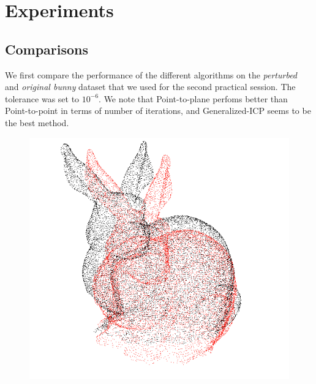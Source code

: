 \documentclass[11pt,letterpaper,leqno]{article}
\begin{document}
\section{Experiments}

\subsection{Comparisons}
We first compare the performance of the different algorithms on the \textit{perturbed} and \textit{original bunny} dataset that we used for the second practical session. The tolerance was set to $10^{-6}$. We note that Point-to-plane perfoms better than Point-to-point in terms of number of iterations, and Generalized-ICP seems to be the best method. 
\begin{figure}[ht!]
    \centering
    \begin{minipage}{0.45\linewidth}
    \includegraphics[width=\linewidth]{img/comparison_1_clouds.png}
    \end{minipage}\hfill
    \begin{minipage}{0.45\linewidth}

\end{minipage}
\end{figure}
\end{document}
